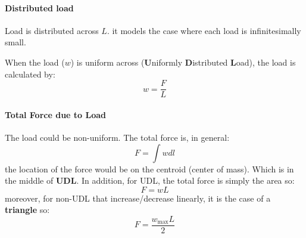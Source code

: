 \paragraph{Distributed load} Load is distributed across $L$. it models the case where each load is infinitesimally small. 
\begin{center}
\end{center}
When the load ($w$) is uniform across (\textbf{U}niformly \textbf{D}istributed \textbf{L}oad), the load  is calculated by:
\begin{equation}
    w = \frac{F}{L}
\end{equation}
\paragraph{Total Force due to Load} The load could be non-uniform. The total force is, in general:
\begin{equation}
    F=\int w dl
\end{equation}
the location of the force would be on the centroid (center of mass). Which is in the middle of \textbf{UDL}. In addition, for UDL, the total force is simply the area so:
\begin{equation}
    F= wL
\end{equation}
moreover, for non-UDL that increase/decrease linearly, it is the case of a \textbf{triangle} so:
\begin{equation}
    F= \frac{w_\text{max}L}{2}
\end{equation}
